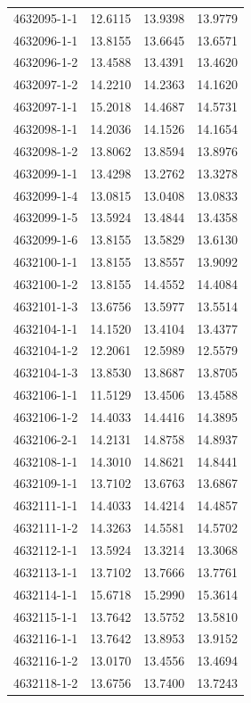 \begin{longtable}{lrrr}
4632095-1-1 & 12.6115 & 13.9398 & 13.9779 \\
4632096-1-1 & 13.8155 & 13.6645 & 13.6571 \\
4632096-1-2 & 13.4588 & 13.4391 & 13.4620 \\
4632097-1-2 & 14.2210 & 14.2363 & 14.1620 \\
4632097-1-1 & 15.2018 & 14.4687 & 14.5731 \\
4632098-1-1 & 14.2036 & 14.1526 & 14.1654 \\
4632098-1-2 & 13.8062 & 13.8594 & 13.8976 \\
4632099-1-1 & 13.4298 & 13.2762 & 13.3278 \\
4632099-1-4 & 13.0815 & 13.0408 & 13.0833 \\
4632099-1-5 & 13.5924 & 13.4844 & 13.4358 \\
4632099-1-6 & 13.8155 & 13.5829 & 13.6130 \\
4632100-1-1 & 13.8155 & 13.8557 & 13.9092 \\
4632100-1-2 & 13.8155 & 14.4552 & 14.4084 \\
4632101-1-3 & 13.6756 & 13.5977 & 13.5514 \\
4632104-1-1 & 14.1520 & 13.4104 & 13.4377 \\
4632104-1-2 & 12.2061 & 12.5989 & 12.5579 \\
4632104-1-3 & 13.8530 & 13.8687 & 13.8705 \\
4632106-1-1 & 11.5129 & 13.4506 & 13.4588 \\
4632106-1-2 & 14.4033 & 14.4416 & 14.3895 \\
4632106-2-1 & 14.2131 & 14.8758 & 14.8937 \\
4632108-1-1 & 14.3010 & 14.8621 & 14.8441 \\
4632109-1-1 & 13.7102 & 13.6763 & 13.6867 \\
4632111-1-1 & 14.4033 & 14.4214 & 14.4857 \\
4632111-1-2 & 14.3263 & 14.5581 & 14.5702 \\
4632112-1-1 & 13.5924 & 13.3214 & 13.3068 \\
4632113-1-1 & 13.7102 & 13.7666 & 13.7761 \\
4632114-1-1 & 15.6718 & 15.2990 & 15.3614 \\
4632115-1-1 & 13.7642 & 13.5752 & 13.5810 \\
4632116-1-1 & 13.7642 & 13.8953 & 13.9152 \\
4632116-1-2 & 13.0170 & 13.4556 & 13.4694 \\
4632118-1-2 & 13.6756 & 13.7400 & 13.7243 \\

\end{longtable}
